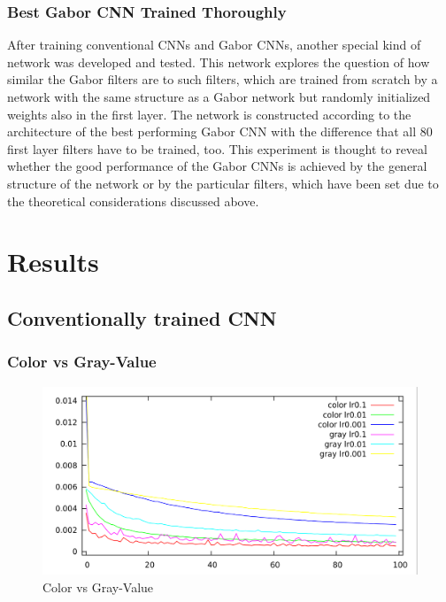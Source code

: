 \documentclass[11pt, a4paper]{article}
\begin{document}
\subsubsection{Best Gabor CNN Trained Thoroughly}

After training conventional \acp{CNN} and Gabor \acp{CNN}, another special kind of network was developed and tested. This network explores the question of how similar the Gabor filters are to such filters, which are trained from scratch by a network with the same structure as a Gabor network but randomly initialized weights also in the first layer. The network is constructed according to the architecture of the best performing Gabor \ac{CNN} with the difference that all 80 first layer filters have to be trained, too. This experiment is thought to reveal whether the good performance of the Gabor \acp{CNN} is achieved by the general structure of the network or by the particular filters, which have been set due to the theoretical considerations discussed above.

\newpage


\section{Results}
\label{sec:results}

\subsection{Conventionally trained CNN}

\subsubsection{Color vs Gray-Value}

\begin{figure}[htbp]
	\centering
	\includegraphics[width=\textwidth]{results/cnn_color_vs_gray.png}
	\caption{Color vs Gray-Value}
	\label{fig:cnn_color_vs_gray}
\end{figure}
\end{document}

